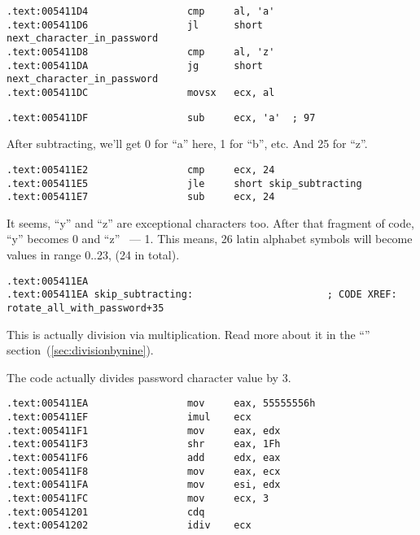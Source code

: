\begin{lstlisting}
.text:005411D4                 cmp     al, 'a'
.text:005411D6                 jl      short next_character_in_password
.text:005411D8                 cmp     al, 'z'
.text:005411DA                 jg      short next_character_in_password
.text:005411DC                 movsx   ecx, al
\end{lstlisting}


\begin{lstlisting}
.text:005411DF                 sub     ecx, 'a'  ; 97
\end{lstlisting}

{After subtracting, we'll get 0 for ``a'' here, 1 for ``b'', etc. And 25 for ``z''.}

\begin{lstlisting}
.text:005411E2                 cmp     ecx, 24
.text:005411E5                 jle     short skip_subtracting
.text:005411E7                 sub     ecx, 24
\end{lstlisting}

{It seems, ``y'' and ``z'' are exceptional characters too. 
After that fragment of code, ``y'' becomes 0 and ``z'' ~--- 1. 
This means, 26 latin alphabet symbols will become values in range 0..23, (24 in total).}

\begin{lstlisting}
.text:005411EA
.text:005411EA skip_subtracting:                       ; CODE XREF: rotate_all_with_password+35
\end{lstlisting}

{This is actually division via multiplication. 
Read more about it in the ``\DivisionByNineSectionName'' section~(\ref{sec:divisionbynine}).}

{The code actually divides password character value by 3.}

\begin{lstlisting}
.text:005411EA                 mov     eax, 55555556h
.text:005411EF                 imul    ecx
.text:005411F1                 mov     eax, edx
.text:005411F3                 shr     eax, 1Fh
.text:005411F6                 add     edx, eax
.text:005411F8                 mov     eax, ecx
.text:005411FA                 mov     esi, edx
.text:005411FC                 mov     ecx, 3
.text:00541201                 cdq
.text:00541202                 idiv    ecx
\end{lstlisting}

